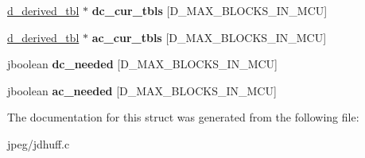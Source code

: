 \begin{DoxyCompactItemize}
\item 
\hyperlink{structd__derived__tbl}{d\+\_\+derived\+\_\+tbl} $\ast$ {\bfseries dc\+\_\+cur\+\_\+tbls} \mbox{[}D\+\_\+\+M\+A\+X\+\_\+\+B\+L\+O\+C\+K\+S\+\_\+\+I\+N\+\_\+\+M\+CU\mbox{]}\hypertarget{structhuff__entropy__decoder_a63725587525df86501d2a632152c01c0}{}\label{structhuff__entropy__decoder_a63725587525df86501d2a632152c01c0}

\item 
\hyperlink{structd__derived__tbl}{d\+\_\+derived\+\_\+tbl} $\ast$ {\bfseries ac\+\_\+cur\+\_\+tbls} \mbox{[}D\+\_\+\+M\+A\+X\+\_\+\+B\+L\+O\+C\+K\+S\+\_\+\+I\+N\+\_\+\+M\+CU\mbox{]}\hypertarget{structhuff__entropy__decoder_af9d82cc6c9c90aa6bc3d5fc324967d7c}{}\label{structhuff__entropy__decoder_af9d82cc6c9c90aa6bc3d5fc324967d7c}

\item 
jboolean {\bfseries dc\+\_\+needed} \mbox{[}D\+\_\+\+M\+A\+X\+\_\+\+B\+L\+O\+C\+K\+S\+\_\+\+I\+N\+\_\+\+M\+CU\mbox{]}\hypertarget{structhuff__entropy__decoder_a58d8711ac18510b1d79582f1190d62cd}{}\label{structhuff__entropy__decoder_a58d8711ac18510b1d79582f1190d62cd}

\item 
jboolean {\bfseries ac\+\_\+needed} \mbox{[}D\+\_\+\+M\+A\+X\+\_\+\+B\+L\+O\+C\+K\+S\+\_\+\+I\+N\+\_\+\+M\+CU\mbox{]}\hypertarget{structhuff__entropy__decoder_a51a8cd8c9f8e9f1737b5722ccfdc22ec}{}\label{structhuff__entropy__decoder_a51a8cd8c9f8e9f1737b5722ccfdc22ec}

\end{DoxyCompactItemize}


The documentation for this struct was generated from the following file\+:\begin{DoxyCompactItemize}
\item 
jpeg/jdhuff.\+c\end{DoxyCompactItemize}
